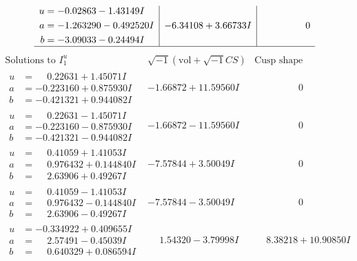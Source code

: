 \documentclass[1p]{elsarticle_modified}
\theoremstyle{definition}
\newcommand{\I}{\sqrt{-1}}
\begin{document}
$$\begin{array}{c|c|c}
\begin{aligned}
u &= -0.02863 - 1.43149 I \\
a &= -1.263290 - 0.492520 I \\
b &= -3.09033 - 0.24494 I\end{aligned}
 & -6.34108 + 3.66733 I & \phantom{-0.000000 } 0\\
 \hline 
 \end{array}$$\newpage$$\begin{array}{c|c|c}  
\text{Solutions to }I^u_{1}& \I (\text{vol} + \sqrt{-1}CS) & \text{Cusp shape}\\
 \hline 
\begin{aligned}
u &= \phantom{-}0.22631 + 1.45071 I \\
a &= -0.223160 + 0.875930 I \\
b &= -0.421321 + 0.944082 I\end{aligned}
 & -1.66872 + 11.59560 I & \phantom{-0.000000 } 0 \\ \hline\begin{aligned}
u &= \phantom{-}0.22631 - 1.45071 I \\
a &= -0.223160 - 0.875930 I \\
b &= -0.421321 - 0.944082 I\end{aligned}
 & -1.66872 - 11.59560 I & \phantom{-0.000000 } 0 \\ \hline\begin{aligned}
u &= \phantom{-}0.41059 + 1.41053 I \\
a &= \phantom{-}0.976432 + 0.144840 I \\
b &= \phantom{-}2.63906 + 0.49267 I\end{aligned}
 & -7.57844 + 3.50049 I & \phantom{-0.000000 } 0 \\ \hline\begin{aligned}
u &= \phantom{-}0.41059 - 1.41053 I \\
a &= \phantom{-}0.976432 - 0.144840 I \\
b &= \phantom{-}2.63906 - 0.49267 I\end{aligned}
 & -7.57844 - 3.50049 I & \phantom{-0.000000 } 0 \\ \hline\begin{aligned}
u &= -0.334922 + 0.409655 I \\
a &= \phantom{-}2.57491 - 0.45039 I \\
b &= \phantom{-}0.640329 + 0.086594 I\end{aligned}
 & \phantom{-}1.54320 - 3.79998 I & \phantom{-}8.38218 + 10.90850 I \\ \hline\begin{aligned}

\end{aligned}
\end{array}$$
\end{document}
